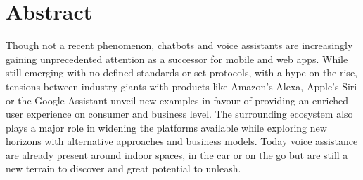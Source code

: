 %
%
%


\newpage
\chapter*{Abstract}

Though not a recent phenomenon, chatbots and voice assistants are increasingly gaining unprecedented attention as a successor for mobile and web apps. While still emerging with no defined standards or set protocols, with a hype on the rise, tensions between industry giants with products like Amazon's Alexa, Apple's Siri or the Google Assistant %
unveil new examples in favour of providing an enriched user experience on consumer and business level. The surrounding ecosystem also plays a major role in widening the platforms available while exploring new horizons with alternative approaches and business models. Today voice assistance are already present around indoor spaces, in the car or on the go but are still a new terrain to discover and great potential to unleash.\\ 

